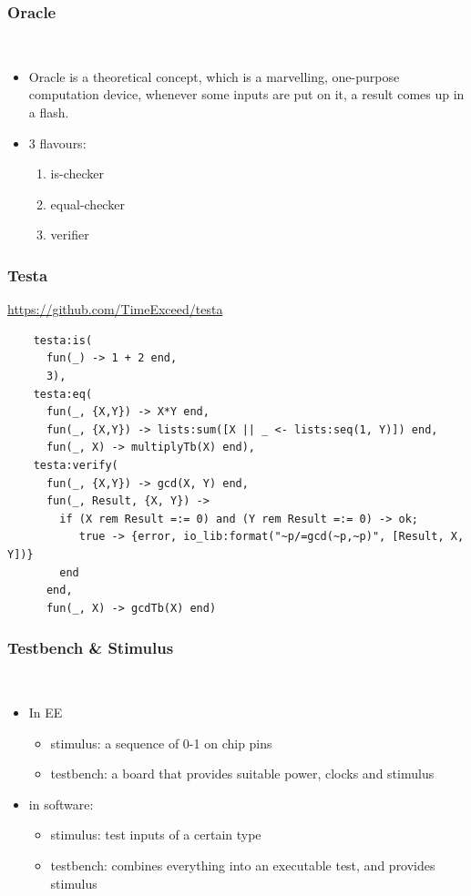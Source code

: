 \documentclass[lualatex]{beamer}
\begin{document}
\begin{frame}
  \frametitle{Oracle}

  \begin{block}{~}
    \begin{itemize}
    \item Oracle is a theoretical concept, which is a marvelling, one-purpose computation device, whenever some inputs are put on it, a result comes up in a flash.
    \item 3 flavours:
      \begin{enumerate}
      \item is-checker
      \item equal-checker
      \item verifier
      \end{enumerate}
    \end{itemize}
  \end{block}
\end{frame}

\begin{frame}[fragile]
  \frametitle{Testa}

  \url{https://github.com/TimeExceed/testa}

  \begin{verbatim}
    testa:is(
      fun(_) -> 1 + 2 end,
      3),
    testa:eq(
      fun(_, {X,Y}) -> X*Y end,
      fun(_, {X,Y}) -> lists:sum([X || _ <- lists:seq(1, Y)]) end,
      fun(_, X) -> multiplyTb(X) end),
    testa:verify(
      fun(_, {X,Y}) -> gcd(X, Y) end,
      fun(_, Result, {X, Y}) ->
        if (X rem Result =:= 0) and (Y rem Result =:= 0) -> ok;
           true -> {error, io_lib:format("~p/=gcd(~p,~p)", [Result, X, Y])}
        end
      end,
      fun(_, X) -> gcdTb(X) end)
  \end{verbatim}
\end{frame}

\begin{frame}
  \frametitle{Testbench \& Stimulus}

  \begin{block}{~}
    \begin{itemize}
    \item In EE
      \begin{itemize}
      \item stimulus: a sequence of 0-1 on chip pins
      \item testbench: a board that provides suitable power, clocks and stimulus
      \end{itemize}
    \item in software:
      \begin{itemize}
      \item stimulus: test inputs of a certain type
      \item testbench: combines everything into an executable test, and provides stimulus
      \end{itemize}
    \end{itemize}
  \end{block}
\end{frame}
\end{document}
